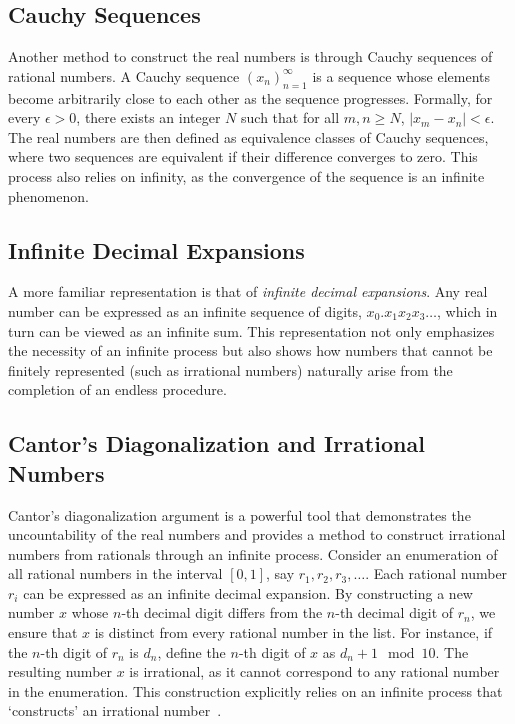 \documentclass[shortAfour,sageh,times]{sagej}
\begin{document}
\subsection{Cauchy Sequences}
Another method to construct the real numbers is through Cauchy sequences of rational numbers. A Cauchy sequence \((x_n)_{n=1}^{\infty}\) is a sequence whose elements become arbitrarily close to each other as the sequence progresses. Formally, for every \(\epsilon > 0\), there exists an integer \(N\) such that for all \(m, n \geq N\), \(|x_m - x_n| < \epsilon\). The real numbers are then defined as equivalence classes of Cauchy sequences, where two sequences are equivalent if their difference converges to zero. This process also relies on infinity, as the convergence of the sequence is an infinite phenomenon.


\subsection{Infinite Decimal Expansions}
A more familiar representation is that of \emph{infinite decimal expansions}. Any real number can be expressed as an infinite sequence of digits,
\(
x_0.x_1x_2x_3\ldots
\),
which in turn can be viewed as an infinite sum. This representation not only emphasizes the necessity of an infinite process but also shows how numbers that cannot be finitely represented (such as irrational numbers) naturally arise from the completion of an endless procedure.



\subsection{Cantor's Diagonalization and Irrational Numbers}
Cantor's diagonalization argument is a powerful tool that demonstrates the uncountability of the real numbers and provides a method to construct irrational numbers from rationals through an infinite process.
Consider an enumeration of all rational numbers in the interval \([0, 1]\), say \(r_1, r_2, r_3, \ldots\).
Each rational number \(r_i\) can be expressed as an infinite decimal expansion.
By constructing a new number \(x\) whose \(n\)-th decimal digit differs from the \(n\)-th decimal digit of \(r_n\),
we ensure that \(x\) is distinct from every rational number in the list.
For instance, if the \(n\)-th digit of \(r_n\) is \(d_n\), define the \(n\)-th digit of \(x\) as \(d_n + 1 \mod 10\).
The resulting number \(x\) is irrational, as it cannot correspond to any rational number in the enumeration.
This construction explicitly relies on an infinite process that `constructs' an irrational number~\citep{Yanofsky-BSL:9051621,bridgman}.
\end{document}
